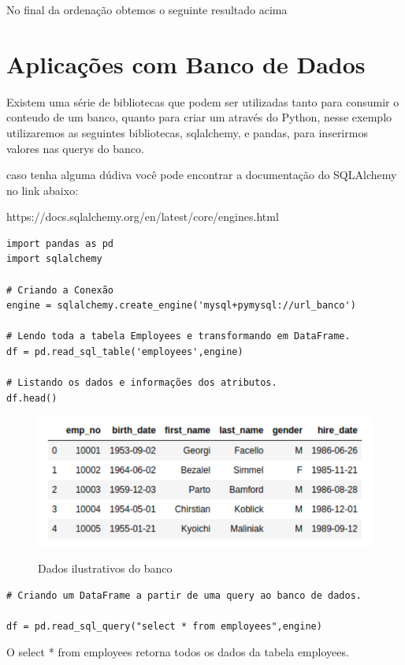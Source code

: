 No final da ordenação obtemos o seguinte resultado acima 


    \section{Aplica\c{c}\~{o}es com Banco de Dados}
    Existem uma série de bibliotecas que podem ser utilizadas tanto para consumir o conteudo de um banco, quanto para criar um através do Python, nesse exemplo utilizaremos as seguintes bibliotecas, sqlalchemy, e pandas, para inserirmos valores nas querys do banco.
    
    caso tenha alguma dúdiva você pode encontrar a documentação do SQLAlchemy no link abaixo: 
    
    https://docs.sqlalchemy.org/en/latest/core/engines.html
    
    
\begin{lstlisting}
import pandas as pd
import sqlalchemy

# Criando a Conexão
engine = sqlalchemy.create_engine('mysql+pymysql://url_banco')

# Lendo toda a tabela Employees e transformando em DataFrame.
df = pd.read_sql_table('employees',engine)

# Listando os dados e informações dos atributos.
df.head()

\end{lstlisting}

\begin{figure}[H]
    \begin{center}
        \caption{Dados ilustrativos do banco} \label{ling1}
        \includegraphics[width=12cm]{Pictures/python_database.png} \\
    \end{center}
\end{figure}

\begin{lstlisting}
# Criando um DataFrame a partir de uma query ao banco de dados.

df = pd.read_sql_query("select * from employees",engine)
\end{lstlisting}

O select * from employees retorna todos os dados da tabela employees.
